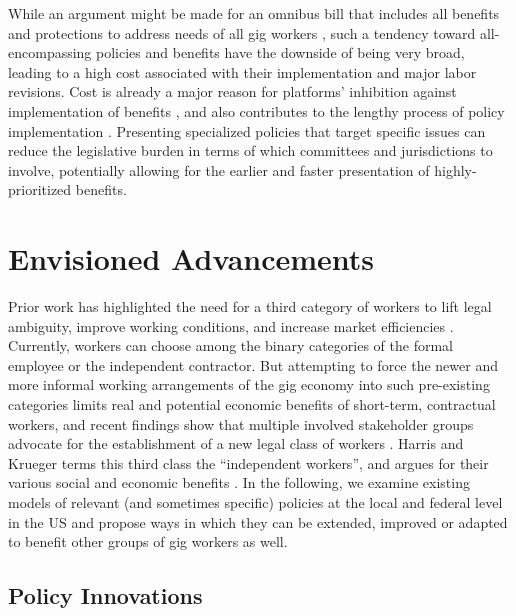 While an argument might be made for an omnibus bill that includes all benefits and protections to address needs of all gig workers \cite{harris2015proposal}, such a tendency toward all-encompassing policies and benefits have the downside of being very broad, leading to a high cost associated with their implementation and major labor revisions. Cost is already a major reason for platforms' inhibition against implementation of benefits \cite{codesign}, and also contributes to the lengthy process of policy implementation \cite{Hudson2019-un}. Presenting specialized policies that target specific issues can reduce the legislative burden in terms of which committees and jurisdictions to involve, potentially allowing for the earlier and faster presentation of highly-prioritized benefits. 

\section{Envisioned Advancements}
Prior work has highlighted the need for a third category of workers to lift legal ambiguity, improve working conditions, and increase market efficiencies \cite{Harris_undated-xb}. Currently, workers can choose among the binary categories of the formal employee or the independent contractor. But attempting to force the newer and more informal working arrangements of the gig economy into such pre-existing categories limits real and potential economic benefits of short-term, contractual workers, and recent findings show that multiple involved stakeholder groups advocate for the establishment of a new legal class of workers \cite{Hsieh2023-cu}. Harris and Krueger terms this third class the ``independent workers'', and argues for their various social and economic benefits \cite{Harris_undated-xb}. In the following, we examine existing models of relevant (and sometimes specific) policies at the local and federal level in the US and propose ways in which they can be extended, improved or adapted to benefit other groups of gig workers as well. 

\subsection{Policy Innovations}
